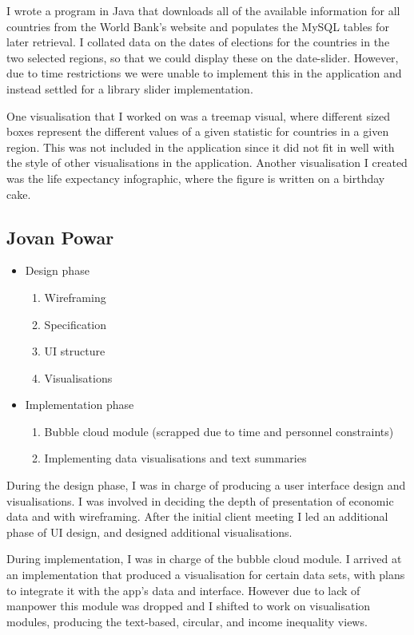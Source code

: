 \documentclass[12pt,a4paper,twoside]{article}
\begin{document}
I wrote a program in Java that downloads all of the available information for all countries from the World Bank’s website and populates the MySQL tables for later retrieval.
I collated data on the dates of elections for the countries in the two selected regions, so that we could display these on the date-slider. However, due to time restrictions we were unable to implement this in the application and instead settled for a library slider implementation.

One visualisation that I worked on was a treemap visual, where different sized boxes represent the different values of a given statistic for countries in a given region. This was not included in the application since it did not fit in well with the style of other visualisations in the application. Another visualisation I created was the life expectancy infographic, where the figure is written on a birthday cake.

\subsection{Jovan Powar}

\begin{itemize}
	\item Design phase
	\begin{enumerate}
		\item Wireframing
		\item Specification
		\item UI structure
		\item Visualisations
	\end{enumerate}
	\item Implementation phase
	\begin{enumerate}
		\item Bubble cloud module (scrapped due to time and personnel constraints)
		\item Implementing data visualisations and text summaries
	\end{enumerate}
\end{itemize}

During the design phase, I was in charge of producing a user interface design and visualisations. I was involved in deciding the depth of presentation of economic data and with wireframing. After the initial client meeting I led an additional phase of UI design, and designed additional visualisations.

During implementation, I was in charge of the bubble cloud module. I arrived at an implementation that produced a visualisation for certain data sets, with plans to integrate it with the app’s data and interface. However due to lack of manpower this module was dropped and I shifted to work on visualisation modules, producing the text-based, circular, and income inequality views.
\end{document}
